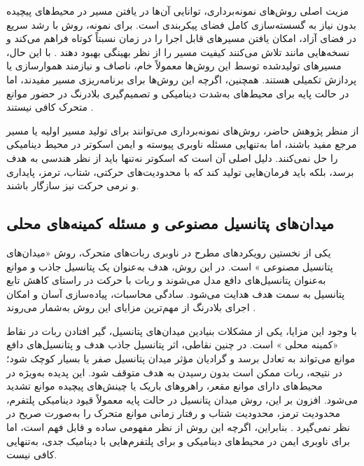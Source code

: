 مزیت اصلی روش‌های نمونه‌برداری، توانایی آن‌ها در یافتن مسیر در محیط‌های پیچیده بدون نیاز به گسسته‌سازی کامل فضای پیکربندی است. برای نمونه، روش  با رشد سریع در فضای آزاد، امکان یافتن مسیرهای قابل اجرا را در زمان نسبتاً کوتاه فراهم می‌کند و نسخه‌هایی مانند  تلاش می‌کنند کیفیت مسیر را از نظر بهینگی بهبود دهند%
\cite{LaValle1998RRT,Karaman2011RRTstar}.
با این حال، مسیرهای تولیدشده توسط این روش‌ها معمولاً خام، ناصاف و نیازمند هموارسازی یا پردازش تکمیلی هستند. همچنین، اگرچه این روش‌ها برای برنامه‌ریزی مسیر مفیدند، اما در حالت پایه برای محیط‌های به‌شدت دینامیکی و تصمیم‌گیری بلادرنگ در حضور موانع متحرک کافی نیستند%
\cite{LaValle2006Planning,Choset2005Principles}.

از منظر پژوهش حاضر، روش‌های نمونه‌برداری می‌توانند برای تولید مسیر اولیه یا مسیر مرجع مفید باشند، اما به‌تنهایی مسئله ناوبری پیوسته و ایمن اسکوتر در محیط دینامیکی را حل نمی‌کنند. دلیل اصلی آن است که اسکوتر نه‌تنها باید از نظر هندسی به هدف برسد، بلکه باید فرمان‌هایی تولید کند که با محدودیت‌های حرکتی، شتاب، ترمز، پایداری و نرمی حرکت نیز سازگار باشند.

\subsection{میدان‌های پتانسیل مصنوعی و مسئله کمینه‌های محلی}

یکی از نخستین رویکردهای مطرح در ناوبری ربات‌های متحرک، روش «میدان‌های پتانسیل مصنوعی%
»
است. در این روش، هدف به‌عنوان یک پتانسیل جاذب و موانع به‌عنوان پتانسیل‌های دافع مدل می‌شوند و ربات با حرکت در راستای کاهش تابع پتانسیل به سمت هدف هدایت می‌شود. سادگی محاسبات، پیاده‌سازی آسان و امکان اجرای بلادرنگ از مهم‌ترین مزایای این روش به‌شمار می‌روند%
\cite{khatib1986}.

با وجود این مزایا، یکی از مشکلات بنیادین میدان‌های پتانسیل، گیر افتادن ربات در نقاط «کمینه محلی%
»
است. در چنین نقاطی، اثر پتانسیل جاذب هدف و پتانسیل‌های دافع موانع می‌تواند به تعادل برسد و گرادیان مؤثر میدان پتانسیل صفر یا بسیار کوچک شود؛ در نتیجه، ربات ممکن است بدون رسیدن به هدف متوقف شود. این پدیده به‌ویژه در محیط‌های دارای موانع مقعر، راهروهای باریک یا چینش‌های پیچیده موانع تشدید می‌شود. افزون بر این، روش میدان پتانسیل در حالت پایه معمولاً قیود دینامیکی پلتفرم، محدودیت ترمز، محدودیت شتاب و رفتار زمانی موانع متحرک را به‌صورت صریح در نظر نمی‌گیرد%
\cite{Koren1991PotentialFields,LaValle2006Planning,Choset2005Principles}.
بنابراین، اگرچه این روش از نظر مفهومی ساده و قابل فهم است، اما برای ناوبری ایمن در محیط‌های دینامیکی و برای پلتفرم‌هایی با دینامیک جدی، به‌تنهایی کافی نیست.

